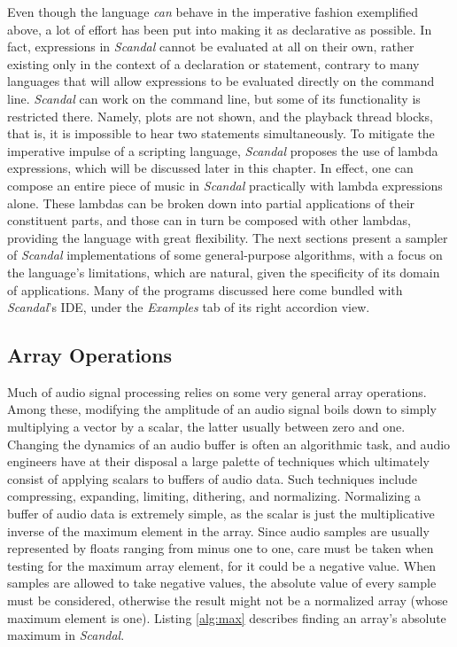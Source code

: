 Even though the language \emph{can} behave in the imperative fashion exemplified above, a lot of effort has been put into making it as declarative as possible. In fact, expressions in \emph{Scandal} cannot be evaluated at all on their own, rather existing only in the context of a declaration or statement, contrary to many languages that will allow expressions to be evaluated directly on the command line. \emph{Scandal} can work on the command line, but some of its functionality is restricted there. Namely, plots are not shown, and the playback thread blocks, that is, it is impossible to hear two  statements simultaneously. To mitigate the imperative impulse of a scripting language, \emph{Scandal} proposes the use of lambda expressions, which will be discussed later in this chapter. In effect, one can compose an entire piece of music in \emph{Scandal} practically with lambda expressions alone. These lambdas can be broken down into partial applications of their constituent parts, and those can in turn be composed with other lambdas, providing the language with great flexibility. The next sections present a sampler of \emph{Scandal} implementations of some general-purpose algorithms, with a focus on the language's limitations, which are natural, given the specificity of its domain of applications. Many of the programs discussed here come bundled with \emph{Scandal}'s IDE, under the \emph{Examples} tab of its right accordion view.

\subsection{Array Operations}

Much of audio signal processing relies on some very general array operations. Among these, modifying the amplitude of an audio signal boils down to simply multiplying a vector by a scalar, the latter usually between zero and one. Changing the dynamics of an audio buffer is often an algorithmic task, and audio engineers have at their disposal a large palette of techniques which ultimately consist of applying scalars to buffers of audio data. Such techniques include compressing, expanding, limiting, dithering, and normalizing. Normalizing a buffer of audio data is extremely simple, as the scalar is just the multiplicative inverse of the maximum element in the array. Since audio samples are usually represented by floats ranging from minus one to one, care must be taken when testing for the maximum array element, for it could be a negative value. When samples are allowed to take negative values, the absolute value of every sample must be considered, otherwise the result might not be a normalized array (whose maximum element is one). Listing \ref{alg:max} describes finding an array's absolute maximum in \emph{Scandal}.

